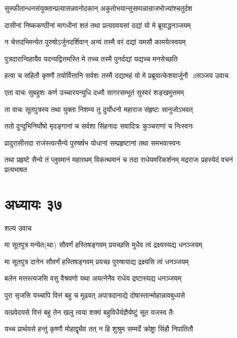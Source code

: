 \twolineshloka
{सुस्फीतान्धनसंयुक्तान्प्रत्यासन्नवनोदकान्}
{अकुतोभयान्सुसम्पन्नान्राजभोज्यांश्चतुर्दश}


\twolineshloka
{दासीनां निष्ककण्ठीनां मागधीनां शतं तथा}
{प्रत्यग्रवयसां दद्यां यो मे ब्रूयाद्धनञ्जयम्}


\twolineshloka
{न चेत्तदभिमन्येत पुरुषोऽर्जुनदर्शिवान्}
{अन्यं तस्मै वरं दद्यां यमसौ कामयेत्स्वयम्}


\twolineshloka
{पुत्रदारान्विहायैव यदन्यद्वित्तमस्ति मे}
{तच्च तस्मै पुनर्दद्यां यद्यच्च मनसेच्छति}


\threelineshloka
{हत्वा च सहितौ कृष्णौ तयोर्वित्तानि सर्वशः}
{तस्मै दद्यामहं यो मे प्रब्रूयात्केशवार्जुनौ ॥सञ्जय उवाच}
{}


\twolineshloka
{एता वाचः सुबहुशः कर्ण उच्चारयन्युधि}
{दध्मौ सागरसम्भूतं सुस्वरं शङ्खमुत्तमम्}


\twolineshloka
{ता वाचः सूतपुत्रस्य तथा युक्ता निशम्य तु}
{दुर्योधनो महाराज संहृष्टः सानुजोऽभवत्}


\twolineshloka
{ततो दुन्दुभिनिर्घोषो मृदङ्गानां च सर्वशा}
{सिंहनादः सवादित्रः कुञ्चराणां च निःस्वनः}


\twolineshloka
{प्रादुरासीत्तदा राजंस्त्वत्सैन्ये पुरुषर्षभ}
{योधानां सम्प्रहृष्टानां तथा समभवत्स्वनः}


\threelineshloka
{तथा प्रहृष्टे सैन्ये तं प्लुवमानं महारथम्}
{विकत्थमानं च तदा राधेयमरिकर्शनम्}
{मद्रराजः प्रहस्येदं वचनं प्रत्यभाषत}


\chapter{अध्यायः ३७}
\twolineshloka
{शल्य उवाच}
{}


\twolineshloka
{मा सूतपुत्र मन्येत(थाः) सौवर्णं हस्तिषङ्गवम्}
{प्रयच्छसि मुधैव त्वं द्रक्ष्यस्यद्य धनञ्जयम्}


\twolineshloka
{मा सूतपुत्र दानेन सौवर्णं हस्तिषङ्गवम्}
{प्रयच्छ पुरुषायाद्य द्रक्ष्यसि त्वं धनञ्जयम्}


\twolineshloka
{बलेन मत्तस्त्यजसि वसु वैश्रवणो यथा}
{अयत्नेनैव राधेय द्रष्टास्यद्य धनञ्जयम्}


\twolineshloka
{पुरा सृजसि यच्चापि वित्तं बहु च मूढवत्}
{अपात्रदानाद्ये दोषास्तान्मोहान्नावबुध्यसे}


\twolineshloka
{यत्प्रवेदयसे वित्तं बहु तेन खलु त्वया}
{शक्यं बहुविधैर्यज्ञैर्यष्टुं सूत यजस्व तैः}


\twolineshloka
{यच्च प्रार्थयसे हन्तुं कृष्णौ मोहाद्वृथैव तत्}
{न हि शुश्रुम सम्मर्दे क्रोष्ट्रा सिंहौ निपातितौ}


